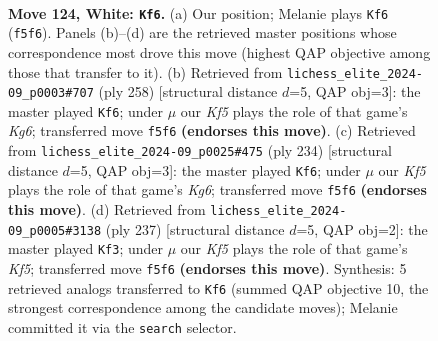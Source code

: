 \documentclass[11pt]{article}
\begin{document}
\clearpage

\begin{figure}[p]\centering
\begin{subfigure}{0.46\textwidth}\centering
\resizebox{\linewidth}{!}{%
\newchessgame
\chessboard[
  setfen={8/R7/3k4/5K2/6P1/8/8/1r2N3 w - - 31 124},
  showmover=false,
  pgfstyle=straightmove, color=movearrow, markmove={f5-f6}
]}
\caption{}
\end{subfigure}\hfill
\begin{subfigure}{0.46\textwidth}\centering
\resizebox{\linewidth}{!}{%
\newchessgame
\chessboard[
  setfen={5k2/R7/6K1/5P2/6r1/8/8/8 w - - 3 130},
  showmover=false,
  pgfstyle=straightmove, color=movearrow, markmove={g6-f6}
]}
\caption{}
\end{subfigure}
\\[4pt]
\begin{subfigure}{0.46\textwidth}\centering
\resizebox{\linewidth}{!}{%
\newchessgame
\chessboard[
  setfen={5k2/1R6/6K1/5P2/8/6r1/8/8 w - - 23 118},
  showmover=false,
  pgfstyle=straightmove, color=movearrow, markmove={g6-f6}
]}
\caption{}
\end{subfigure}\hfill
\begin{subfigure}{0.46\textwidth}\centering
\resizebox{\linewidth}{!}{%
\newchessgame
\chessboard[
  setfen={8/8/8/6p1/R4k2/8/7r/5K2 b - - 1 119},
  showmover=false,
  pgfstyle=straightmove, color=movearrow, markmove={f4-f3}
]}
\caption{}
\end{subfigure}
\caption{\textbf{Move 124, White: \texttt{Kf6}.} (a) Our position; Melanie plays \texttt{Kf6} (\texttt{f5f6}). Panels (b)--(d) are the retrieved master positions whose correspondence most drove this move (highest QAP objective among those that transfer to it). (b) Retrieved from \texttt{lichess\_elite\_2024-09\_p0003\#707} (ply 258) [structural distance $d$=5, QAP obj=3]: the master played \texttt{Kf6}; under $\mu$ our \emph{Kf5} plays the role of that game's \emph{Kg6}; transferred move \texttt{f5f6} \textbf{(endorses this move)}. (c) Retrieved from \texttt{lichess\_elite\_2024-09\_p0025\#475} (ply 234) [structural distance $d$=5, QAP obj=3]: the master played \texttt{Kf6}; under $\mu$ our \emph{Kf5} plays the role of that game's \emph{Kg6}; transferred move \texttt{f5f6} \textbf{(endorses this move)}. (d) Retrieved from \texttt{lichess\_elite\_2024-09\_p0005\#3138} (ply 237) [structural distance $d$=5, QAP obj=2]: the master played \texttt{Kf3}; under $\mu$ our \emph{Kf5} plays the role of that game's \emph{Kf5}; transferred move \texttt{f5f6} \textbf{(endorses this move)}. Synthesis: 5 retrieved analogs transferred to \texttt{Kf6} (summed QAP objective 10, the strongest correspondence among the candidate moves); Melanie committed it via the \texttt{search} selector.}
\label{fig:thought-m246}
\end{figure}
\end{document}
